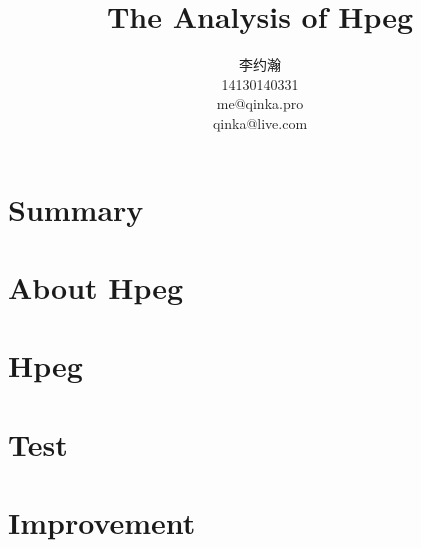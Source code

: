 \documentclass{ctexart}
\title{The Analysis of Hpeg}
\author{李约瀚 \\ 14130140331 \\ me@qinka.pro \\ qinka@live.com}
\begin{document}
\maketitle
\newpage
\tableofcontents
\newpage

\section{Summary}
\label{sec:summary}

\section{About Hpeg}
\label{sec:abouthpeg}

\section{Hpeg}
\label{sec:hpeg}

\section{Test}
\label{sec:test}

\section{Improvement}
\label{sec:improvement}
\end{document}
